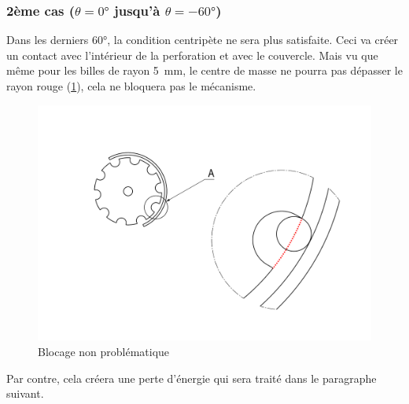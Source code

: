\subsubsection{2ème cas ($\theta = \ang{0}$ jusqu'à $\theta = \ang{-60}$)}
Dans les derniers \ang{60}, la condition centripète ne sera plus satisfaite. Ceci va créer un contact avec l'intérieur de la perforation et avec le couvercle. Mais vu que même pour les billes de rayon \SI{5}{\milli\metre}, le centre de masse ne pourra pas dépasser le rayon rouge (\ref{fig:4.2}), cela ne bloquera pas le mécanisme.
\begin{figure}
    \centering
    \includegraphics[width=\textwidth]{Graphics/Dessins_justification_Leon/DESSIN_BLOQUAGE_IMPROBLEMATIQUE.pdf}
    \caption{Blocage non problématique}
    \label{fig:4.2}
\end{figure}

Par contre, cela créera une perte d'énergie qui sera traité dans le paragraphe suivant.

